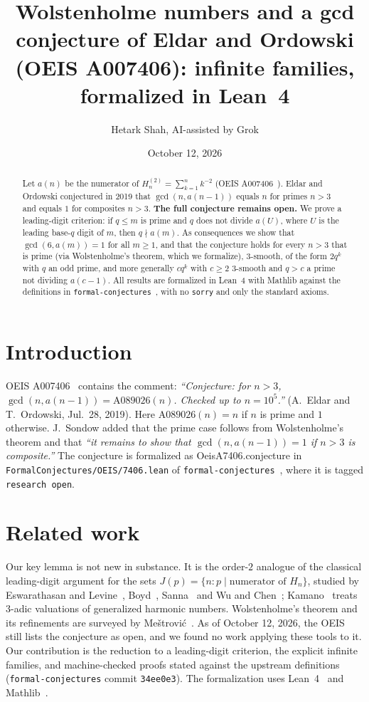 \documentclass[11pt]{article}
\author{Hetark Shah, AI-assisted by Grok}
\date{October 12, 2026}
\title{Wolstenholme numbers and a gcd conjecture of Eldar and Ordowski (OEIS A007406): infinite families, formalized in Lean~4}
\theoremstyle{remark}\newtheorem{remark}[theorem]{Remark}
\newcommand{\lean}[1]{{\ttfamily\def\_{\textunderscore\allowbreak}\def\/{/\allowbreak}#1}}
\newcommand{\Hh}{H^{(2)}}
\begin{document}
\maketitle
\begin{abstract}
Let $a(n)$ be the numerator of $\Hh_n=\sum_{k=1}^n k^{-2}$ (OEIS A007406~\cite{oeis}). Eldar and Ordowski conjectured in 2019 that $\gcd(n,a(n-1))$ equals $n$ for primes $n>3$ and equals $1$ for composites $n>3$. \textbf{The full conjecture remains open.} We prove a leading-digit criterion: if $q\le m$ is prime and $q$ does not divide $a(U)$, where $U$ is the leading base-$q$ digit of $m$, then $q\nmid a(m)$. As consequences we show that $\gcd(6,a(m))=1$ for all $m\ge1$, and that the conjecture holds for every $n>3$ that is prime (via Wolstenholme's theorem, which we formalize), $3$-smooth, of the form $2q^k$ with $q$ an odd prime, and more generally $cq^k$ with $c\ge2$ $3$-smooth and $q>c$ a prime not dividing $a(c-1)$. All results are formalized in Lean~4 with Mathlib against the definitions in \texttt{formal-conjectures}~\cite{fc}, with no \texttt{sorry} and only the standard axioms.
\end{abstract}

\section{Introduction}
OEIS A007406~\cite{oeis} contains the comment: \emph{``Conjecture: for $n>3$, $\gcd(n,a(n-1))=\mathrm{A089026}(n)$. Checked up to $n=10^5$.''} (A.~Eldar and T.~Ordowski, Jul.~28, 2019). Here $\mathrm{A089026}(n)=n$ if $n$ is prime and $1$ otherwise. J.~Sondow added that the prime case follows from Wolstenholme's theorem and that \emph{``it remains to show that $\gcd(n,a(n-1))=1$ if $n>3$ is composite.''} The conjecture is formalized as \lean{OeisA7406.conjecture} in \nolinkurl{FormalConjectures/OEIS/7406.lean} of \texttt{formal-conjectures}~\cite{fc}, where it is tagged \texttt{research open}.

\section{Related work}
Our key lemma is not new in substance. It is the order-$2$ analogue of the classical leading-digit argument for the sets $J(p)=\{n:p\mid\text{numerator of }H_n\}$, studied by Eswarathasan and Levine~\cite{el}, Boyd~\cite{boyd}, Sanna~\cite{sanna} and Wu and Chen~\cite{wc}; Kamano~\cite{kam} treats $3$-adic valuations of generalized harmonic numbers. Wolstenholme's theorem and its refinements are surveyed by Me\v{s}trovi\'c~\cite{mes}. As of October 12, 2026, the OEIS still lists the conjecture as open, and we found no work applying these tools to it. Our contribution is the reduction to a leading-digit criterion, the explicit infinite families, and machine-checked proofs stated against the upstream definitions (\texttt{formal-conjectures} commit \texttt{34ee0e3}). The formalization uses Lean~4~\cite{lean4} and Mathlib~\cite{mathlib}.
\end{document}
